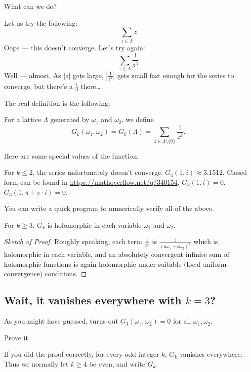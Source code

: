 What can we do?

Let us try the following:
\[ \sum_{z \in \Lambda} z \]
Oops --- this doesn't converge. Let's try again:
\[ \sum_{z \in \Lambda} \frac{1}{z^4} \]
Well --- almost. As $|z|$ gets large, $|\frac{1}{z^4}|$ gets small fast enough for the series to
converge, but there's a $\frac{1}{0}$ there\dots

The real definition is the following:
\begin{definition}
	For a lattice $\Lambda$ generated by $\omega_1$ and $\omega_2$, we define
	\[ G_k(\omega_1, \omega_2) = G_k(\Lambda) =
	\sum_{z \in \Lambda \setminus \{ 0 \}} \frac{1}{z^k}. \]
\end{definition}

\begin{example}
	Here are some special values of the function.
	\begin{itemize}
		\ii For $k \leq 2$, the series unfortunately doesn't converge.
		\ii $G_4(1, i) \approx 3.1512$.
		Closed form can be found in \url{https://mathoverflow.net/q/340154}.
		\ii $G_3(1, i) = 0$.
		\ii $G_3(1, \pi+e \cdot i) = 0$.
	\end{itemize}
\end{example}

You can write a quick program to numerically verify all of the above.

\begin{claim}
	For $k \geq 3$, $G_k$ is holomorphic in each variable $\omega_1$ and $\omega_2$.
\end{claim}
\begin{proof}[Sketch of Proof]
	Roughly speaking, each term $\frac{1}{z^k}$ is $\frac{1}{(a \omega_1+b \omega_2)^k}$
	which is holomorphic in each variable,
	and an absolutely convergent infinite sum of holomorphic functions
	is again holomorphic under suitable (local uniform convergence) conditions.
\end{proof}

\subsection{Wait, it vanishes everywhere with $k=3$?}

As you might have guessed, turns out $G_3(\omega_1, \omega_2) = 0$ for all $\omega_1, \omega_2$.
\begin{exercise}
	Prove it.
\end{exercise}

If you did the proof correctly, for every odd integer $k$, $G_k$ vanishes everywhere.
Thus we normally let $k \geq 4$ be even, and write $G_k$.

